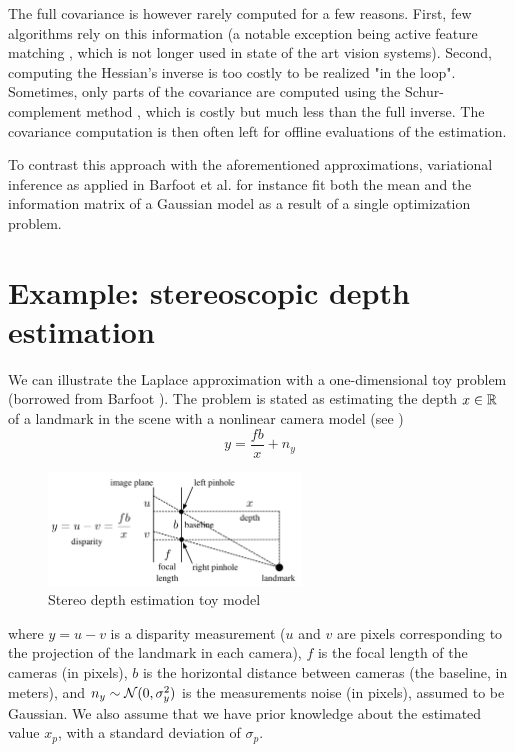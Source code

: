The full covariance is however rarely computed for a few reasons. First, few algorithms rely on this information (a notable exception being active feature matching \cite{davison2007monoslam}, which is not longer used in state of the art vision systems). Second, computing the Hessian's inverse is too costly to be realized "in the loop". Sometimes, only parts of the covariance are computed using the Schur-complement method \cite{konolige2005slam}, which is costly but much less than the full inverse.
The covariance computation is then often left for offline evaluations of the estimation.

To contrast this approach with the aforementioned approximations, variational inference as applied in Barfoot et al. 
\cite{barfoot2020exactly} for instance fit both the mean and the information matrix of a Gaussian model as a result of a single optimization problem.



\section{Example: stereoscopic depth estimation}

We can illustrate the Laplace approximation with a one-dimensional toy problem (borrowed from Barfoot \cite[Section 4.1.1]{barfoot2017state}).
The problem is stated as estimating the depth $x \in \mathbb{R}$ of a landmark in the scene with a nonlinear camera model (see )
%
\begin{equation}
    y = \frac{fb}{x} + n_y
\end{equation}
%
%
\begin{figure}[h]
    \centering
    \includegraphics[width=0.6\textwidth]{figures/barfoot_stereo.png}
    \caption{Stereo depth estimation toy model \cite{barfoot2017state}}
    \label{fig:barfoot_stereo}
 \end{figure}
%
where $y=u - v$ is a disparity measurement ($u$ and $v$ are pixels corresponding to the projection of the landmark in each camera), $f$ is the focal
length of the cameras (in pixels), $b$ is the horizontal distance between cameras (the baseline, in meters), and $n_y \sim \mathcal{N}({0},{\sigma_y^2})$ 
is the measurements noise (in pixels), assumed to be Gaussian. We also assume that we have prior knowledge about the 
estimated value $x_p$, with a standard deviation of $\sigma_p$.

